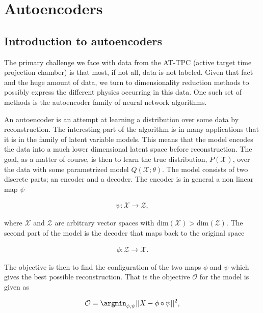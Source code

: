 
\chapter{Autoencoders}\label{sec:autoencoder}

\section{Introduction to autoencoders}\label{sec:intro_autoenc}

The primary challenge we face with data from the AT-TPC (active target time projection chamber) is that most, if not all, data is not labeled. Given that fact and the huge amount of data, we turn to dimensionality reduction methods to possibly express the different physics occurring in this data. One such set of methods is the autoencoder family of neural network algorithms.

An autoencoder is an attempt at learning a distribution over some data by reconstruction. The interesting part of the algorithm is in many applications that it is in the family of latent variable models. This means that the model encodes the data into a much lower dimensional latent space before reconstruction. The goal, as a matter of course, is then to learn the true distribution, $P(\mathcal{X})$, over the data with some parametrized model $Q(\mathcal{X};\theta)$. The model consists of two discrete parts; an encoder and a decoder. The encoder is in general a non linear map $\psi$

\begin{align*}
  \psi: \mathcal{X} \rightarrow \mathcal{Z},
\end{align*}

\noindent where $\mathcal{X} $ and $\mathcal{Z}$ are arbitrary vector spaces with $\text{dim}(\mathcal{X}) > \text{dim}(\mathcal{Z})$.
The second part of the model is the decoder that maps back to the original space

\begin{align*}
  \phi: \mathcal{Z} \rightarrow \mathcal{X}.
\end{align*}

\noindent The objective is then to find the configuration of the two maps $\phi$ and $\psi$ which gives the best possible reconstruction. That is the objective $\mathcal{O}$ for the model is given as

\begin{align}\label{eq:objective_autoenc}
  \mathcal{O} = \argmin_{\phi, \psi} || X - \phi \circ \psi||^2,
\end{align}

